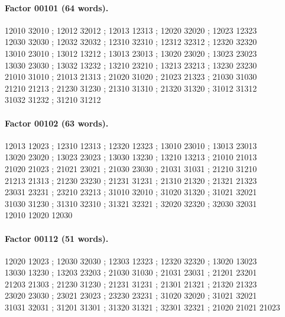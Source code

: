 \documentclass[11pt]{article}
\theoremstyle{remark}
\numberwithin{equation}{section}
\begin{document}
\paragraph{Factor 00101 (64 words).}
\begingroup\small\ttfamily\begin{flushleft}
12010 32010 ; 12012 32012 ; 12013 12313 ; 12020 32020 ; 12023 12323\\
12030 32030 ; 12032 32032 ; 12310 32310 ; 12312 32312 ; 12320 32320\\
13010 23010 ; 13012 13212 ; 13013 23013 ; 13020 23020 ; 13023 23023\\
13030 23030 ; 13032 13232 ; 13210 23210 ; 13213 23213 ; 13230 23230\\
21010 31010 ; 21013 21313 ; 21020 31020 ; 21023 21323 ; 21030 31030\\
21210 21213 ; 21230 31230 ; 21310 31310 ; 21320 31320 ; 31012 31312\\
31032 31232 ; 31210 31212\\
\end{flushleft}\endgroup
\paragraph{Factor 00102 (63 words).}
\begingroup\small\ttfamily\begin{flushleft}
12013 12023 ; 12310 12313 ; 12320 12323 ; 13010 23010 ; 13013 23013\\
13020 23020 ; 13023 23023 ; 13030 13230 ; 13210 13213 ; 21010 21013\\
21020 21023 ; 21021 23021 ; 21030 23030 ; 21031 31031 ; 21210 31210\\
21213 21313 ; 21230 23230 ; 21231 31231 ; 21310 21320 ; 21321 21323\\
23031 23231 ; 23210 23213 ; 31010 32010 ; 31020 31320 ; 31021 32021\\
31030 31230 ; 31310 32310 ; 31321 32321 ; 32020 32320 ; 32030 32031\\
12010 12020 12030\\
\end{flushleft}\endgroup
\paragraph{Factor 00112 (51 words).}
\begingroup\small\ttfamily\begin{flushleft}
12020 12023 ; 12030 32030 ; 12303 12323 ; 12320 32320 ; 13020 13023\\
13030 13230 ; 13203 23203 ; 21030 31030 ; 21031 23031 ; 21201 23201\\
21203 21303 ; 21230 31230 ; 21231 31231 ; 21301 21321 ; 21320 21323\\
23020 23030 ; 23021 23023 ; 23230 23231 ; 31020 32020 ; 31021 32021\\
31031 32031 ; 31201 31301 ; 31320 31321 ; 32301 32321 ; 21020 21021 21023\\
\end{flushleft}\endgroup
\end{document}
